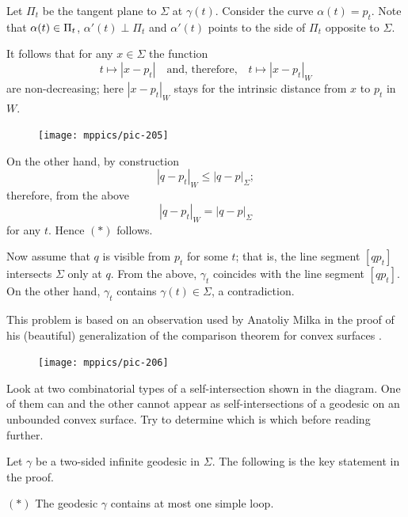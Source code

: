 \medskip

Let $\Pi_t$ be the tangent plane to $\Sigma$ at $\gamma(t)$.
Consider the curve $\alpha(t)=p_t$.
Note that  
$\alpha(t)\z\in\Pi_t$,
$\alpha'(t)\perp\Pi_t$
and $\alpha'(t)$ points to the side of $\Pi_t$ opposite to $\Sigma$.



It follows that for any $x\in\Sigma$ the function  
\[t\mapsto |x - p_t|
\quad\text{and, therefore,}\quad
t\mapsto |x - p_t|_W\] are non-decreasing;
here $|x - p_t|_W$ stays for the intrinsic distance from $x$ to $p_t$ in $W$.


\begin{figure}
\vskip-6mm
\centering
\texttt{[image: mppics/pic-205]}
\end{figure}

On the other hand, by construction 
\[|q - p_t|_W\le |q - p|_\Sigma;\] 
therefore, from the above 
\[|q - p_t|_W= |q - p|_\Sigma\]
for any $t$.
Hence $(*)$ follows.

Now assume that $q$ is visible from $p_t$ for some $t$;
that is, the line segment $[qp_t]$ intersects $\Sigma$ only at $q$.
From the above, 
$\gamma_t$  coincides with the line segment $[qp_t]$.
On the other hand, $\gamma_t$ contains $\gamma(t)\in\Sigma$, a contradiction.\qeds

This problem is based on an observation used by Anatoliy Milka in the proof of his (beautiful) generalization of the comparison theorem for convex surfaces \cite{milka-geod}.


\begin{figure}
\vskip-0mm
\centering
\texttt{[image: mppics/pic-206]}
\end{figure}

Look at two combinatorial types of a self-intersection shown in the diagram.
One of them can and the other cannot appear as self-intersections of a geodesic on an unbounded convex surface.
Try to determine which is which before reading further.

\medskip

Let $\gamma$ be a two-sided infinite geodesic in $\Sigma$.
The following is the key statement in the proof.

\begin{cl}{$({*})$}
The geodesic $\gamma$ contains at most one simple loop.
\end{cl}

